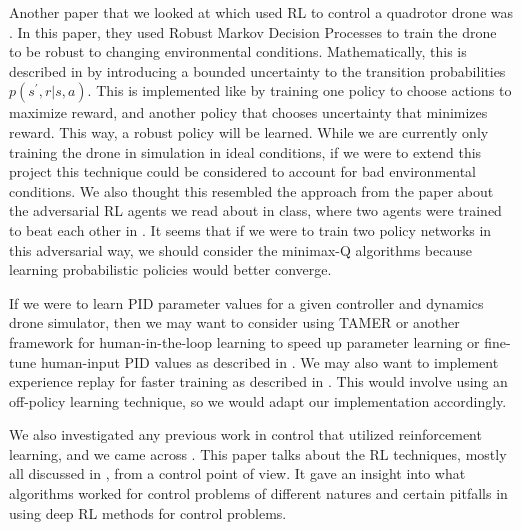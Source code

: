 \documentclass{article}
\begin{document}
Another paper that we looked at which used RL to control a quadrotor drone was \cite{robust}. In this paper, they used Robust Markov Decision Processes to train the drone to be robust to changing environmental conditions. Mathematically, this is described in \cite{RobustMath} by introducing a bounded uncertainty to the transition probabilities $p(s^\prime, r | s, a)$. This is implemented like \cite{adversarial} by training one policy to choose actions to maximize reward, and another policy that chooses uncertainty that minimizes reward. This way, a robust policy will be learned. While we are currently only training the drone in simulation in ideal conditions, if we were to extend this project this technique could be considered to account for bad environmental conditions. We also thought this resembled the approach from the paper about the adversarial RL agents we read about in class, where two agents were trained to beat each other in \cite{markovgames}. It seems that if we were to train two policy networks in this adversarial way, we should consider the minimax-Q algorithms because learning probabilistic policies would better converge.

If we were to learn PID parameter values for a given controller and dynamics drone simulator, then we may want to consider using TAMER or another framework for human-in-the-loop learning to speed up parameter learning or fine-tune human-input PID values as described in \cite{tamer}. We may also want to implement experience replay for faster training as described in \cite{replay}. This would involve using an off-policy learning technique, so we would adapt our implementation accordingly.

We also investigated any previous work in control that utilized reinforcement learning, and we came across \cite{control}. This paper talks about the RL techniques, mostly all discussed in \cite{sutton}, from a control point of view. It gave an insight into what algorithms worked for control problems of different natures and certain pitfalls in using deep RL methods for control problems.



\printbibliography


\end{document}
